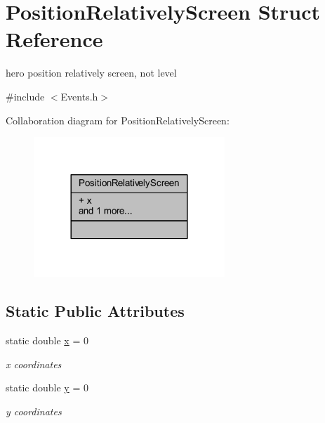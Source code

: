 \hypertarget{struct_position_relatively_screen}{}\section{Position\+Relatively\+Screen Struct Reference}
\label{struct_position_relatively_screen}


hero position relatively screen, not level  




{\ttfamily \#include $<$Events.\+h$>$}



Collaboration diagram for Position\+Relatively\+Screen\+:\nopagebreak
\begin{figure}[H]
\begin{center}
\leavevmode
\includegraphics[width=204pt]{struct_position_relatively_screen__coll__graph}
\end{center}
\end{figure}
\subsection*{Static Public Attributes}
\begin{DoxyCompactItemize}
\item 
\mbox{\label{struct_position_relatively_screen_ac1e997b81f9705f4a76f1bf9df9f9fd9}} 
static double \hyperlink{struct_position_relatively_screen_ac1e997b81f9705f4a76f1bf9df9f9fd9}{x} = 0
\begin{DoxyCompactList}\small\item\em x coordinates \end{DoxyCompactList}\item 
\mbox{\label{struct_position_relatively_screen_a1b0b578732e926941d2b5533bcc16c62}} 
static double \hyperlink{struct_position_relatively_screen_a1b0b578732e926941d2b5533bcc16c62}{y} = 0
\begin{DoxyCompactList}\small\item\em y coordinates \end{DoxyCompactList}\end{DoxyCompactItemize}


